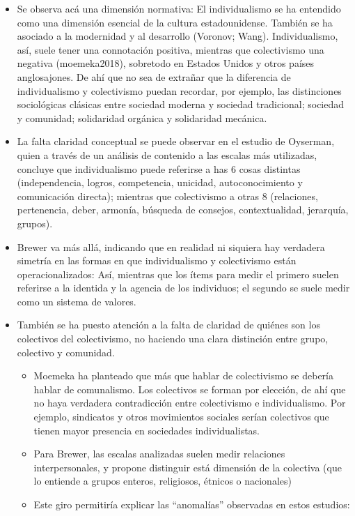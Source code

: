 \documentclass[12pt,twoside]{templates/facsothesis}
\providecommand{\tightlist}{%
  \setlength{\itemsep}{0pt}\setlength{\parskip}{0pt}}
\begin{document}
\begin{itemize}
  \begin{itemize}
  \tightlist
  \item
    Se observa acá una dimensión normativa: El individualismo se ha entendido como una dimensión esencial de la cultura estadounidense. También se ha asociado a la modernidad y al desarrollo (Voronov; Wang). Individualismo, así, suele tener una connotación positiva, mientras que colectivismo una negativa (moemeka2018), sobretodo en Estados Unidos y otros países anglosajones. De ahí que no sea de extrañar que la diferencia de individualismo y colectivismo puedan recordar, por ejemplo, las distinciones sociológicas clásicas entre sociedad moderna y sociedad tradicional; sociedad y comunidad; solidaridad orgánica y solidaridad mecánica.
  \item
    La falta claridad conceptual se puede observar en el estudio de Oyserman, quien a través de un análisis de contenido a las escalas más utilizadas, concluye que individualismo puede referirse a has 6 cosas distintas (independencia, logros, competencia, unicidad, autoconocimiento y comunicación directa); mientras que colectivismo a otras 8 (relaciones, pertenencia, deber, armonía, búsqueda de consejos, contextualidad, jerarquía, grupos).
  \item
    Brewer va más allá, indicando que en realidad ni siquiera hay verdadera simetría en las formas en que individualismo y colectivismo están operacionalizados: Así, mientras que los ítems para medir el primero suelen referirse a la identida y la agencia de los individuos; el segundo se suele medir como un sistema de valores.
  \item
    También se ha puesto atención a la falta de claridad de quiénes son los colectivos del colectivismo, no haciendo una clara distinción entre grupo, colectivo y comunidad.

    \begin{itemize}
    \tightlist
    \item
      Moemeka ha planteado que más que hablar de colectivismo se debería hablar de comunalismo. Los colectivos se forman por elección, de ahí que no haya verdadera contradicción entre colectivismo e individualismo. Por ejemplo, sindicatos y otros movimientos sociales serían colectivos que tienen mayor presencia en sociedades individualistas.
    \item
      Para Brewer, las escalas analizadas suelen medir relaciones interpersonales, y propone distinguir está dimensión de la colectiva (que lo entiende a grupos enteros, religiosos, étnicos o nacionales)
    \item
      Este giro permitiría explicar las ``anomalías'' observadas en estos estudios:


\end{itemize}
\end{itemize}
\end{itemize}
\end{document}
